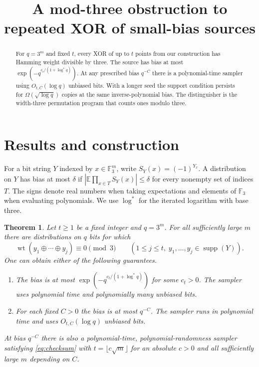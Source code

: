 \documentclass[11pt]{article}
\title{A mod-three obstruction to repeated XOR of small-bias sources}
\author{}
\date{}
\newtheorem{theorem}{Theorem}
\newcommand{\F}{\mathbb F_3}
\newcommand{\wt}{\operatorname{wt}}
\begin{document}
\maketitle
\vspace{-3em}
\begin{abstract}
For $q=3^m$ and fixed $t$, every XOR of up to $t$ points from our
construction has Hamming weight divisible by three. The source has
bias at most $\exp(-q^{c_t/(1+\log^*q)})$.
At any prescribed bias $q^{-C}$ there is a polynomial-time sampler
using $O_{t,C}(\log q)$ unbiased bits. With a longer seed the support
condition persists for $\Omega(\sqrt{\log q})$ copies at the same
inverse-polynomial bias. The distinguisher is the width-three
permutation program that counts ones modulo three.
\end{abstract}

\section{Results and construction}
For a bit string $Y$ indexed by $x\in\F^m$, write $S_Y(x)=(-1)^{Y_x}$.
A distribution on $Y$ has bias at most $\delta$ if
$|\mathbb E\prod_{x\in T}S_Y(x)|\le\delta$ for every nonempty set
of indices $T$. The signs denote real numbers when taking expectations
and elements of $\F$ when evaluating polynomials. We use
$\log^*$ for the iterated logarithm with base three.

\begin{theorem}\label{thm:main}
Let $t\ge1$ be a fixed integer and $q=3^m$. For all sufficiently
large $m$ there are distributions on $q$ bits for which
\begin{equation}
 \wt(y_1\oplus\cdots\oplus y_j)\equiv0\pmod 3
 \qquad(1\le j\le t,\; y_1,\dots,y_j\in\operatorname{supp}(Y)).
 \label{eq:checksum}
\end{equation}
One can obtain either of the following guarantees.
\begin{enumerate}
\item\label{item:tiny} The bias is at most
$\exp(-q^{c_t/(1+\log^*q)})$ for some $c_t>0$.
The sampler uses polynomial time and polynomially many unbiased bits.
\item\label{item:short} For each fixed $C>0$ the bias is at most $q^{-C}$.
The sampler runs in polynomial time and uses $O_{t,C}(\log q)$ unbiased bits.
\end{enumerate}
At bias $q^{-C}$ there is also a polynomial-time, polynomial-randomness
sampler satisfying \eqref{eq:checksum} with
$t=\lfloor c\sqrt m\rfloor$ for an absolute $c>0$ and all sufficiently
large $m$ depending on $C$.
\end{theorem}
\end{document}

